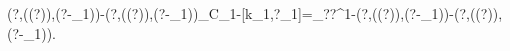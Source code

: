 {\Vert{}(?,\wp(\vartheta(?)),\vartheta(?-\sigma_{1}))-(?,\wp(\overset{\sim}{\vartheta}(?)),\overset{\sim}{\vartheta}(?-\sigma_{1}))\Vert}_{C_{1-\gamma}[k\sigma_{1},?_{1}]}=\max_{?\in[k\sigma_{1},?_{1}]}\Vert?^{1-\gamma}(?,\wp(\vartheta(?)),\vartheta(?-\sigma_{1}))-(?,\wp(\overset{\sim}{\vartheta}(?)),\overset{\sim}{\vartheta}(?-\sigma_{1}))\Vert.